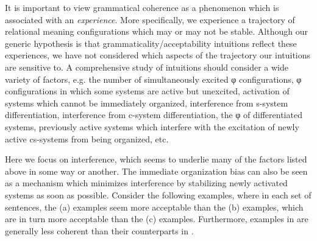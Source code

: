 It is important to view grammatical coherence as a phenomenon which is associated with an \textit{experience}. More specifically, we experience a trajectory of relational meaning configurations which may or may not be stable. Although our generic hypothesis is that grammaticality/acceptability intuitions reflect these experiences, we have not considered which aspects of the trajectory our intuitions are sensitive to. A comprehensive study of intuitions should consider a wide variety of factors, e.g. the number of simultaneously excited φ configurations, φ configurations in which some systems are active but unexcited, activation of systems which cannot be immediately organized, interference from s-system differentiation, interference from c-system differentiation, the φ of differentiated systems, previously active systems which interfere with the excitation of newly active cs-systems from being organized, etc. 

  Here we focus on interference, which seems to underlie many of the factors listed above in some way or another. The immediate organization bias can also be seen as a mechanism which minimizes interference by stabilizing newly activated systems as soon as possible. Consider the following examples, where in each set of sentences, the (a) examples seem more acceptable than the (b) examples, which are in turn more acceptable than the (c) examples. Furthermore, examples in  are generally less coherent than their counterparts in .  

